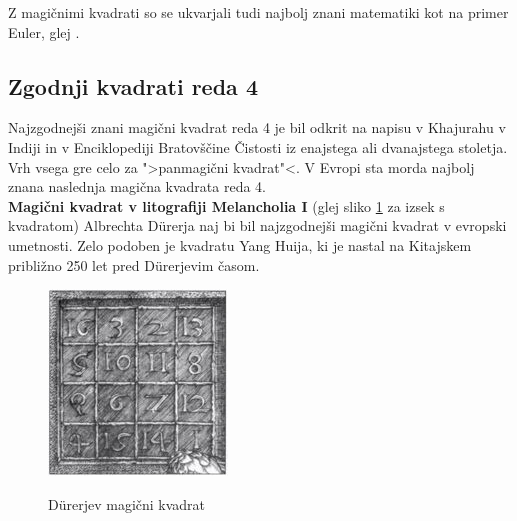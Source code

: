 \documentclass[a4paper,12pt]{article}
\theoremstyle{definition}
\theoremstyle{plain}
\begin{document}
Z magičnimi kvadrati so se ukvarjali tudi najbolj znani matematiki kot na
primer Euler, glej \cite{euler}. %


\subsection{Zgodnji kvadrati reda 4}

Najzgodnejši znani magični kvadrat reda 4 je bil odkrit na napisu
v Khajurahu v Indiji in v Enciklopediji Bratovščine Čistosti iz enajstega
ali dvanajstega stoletja. Vrh vsega gre celo za ">panmagični kvadrat"<.
V Evropi sta morda najbolj znana naslednja magična kvadrata reda 4.
\\[9pt]
\textbf{Magični kvadrat v litografiji Melancholia I} (glej sliko \ref{fig:durer}
za izsek s kvadratom) Albrechta Dürerja naj bi bil najzgodnejši magični kvadrat
v evropski umetnosti. Zelo podoben je kvadratu Yang Huija, ki je nastal na Kitajskem
približno 250 let pred Dürerjevim časom. %

\begin{figure}[!ht]
   \centering
   \caption{Dürerjev magični kvadrat}
   \includegraphics[scale=1.5]{durer.png}
   \label{fig:durer}
\end{figure}
\end{document}
